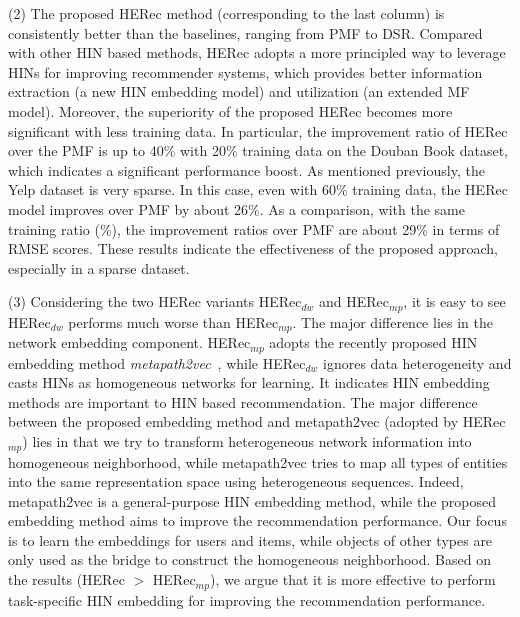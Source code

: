 (2) The proposed HERec method (corresponding to the last column) is consistently better than the baselines, ranging from PMF to DSR.
Compared with other HIN based methods,  HERec adopts a more principled way to leverage HINs for improving recommender systems, which provides better information extraction (a new HIN embedding model) and utilization (an extended MF model).
Moreover, the superiority of the proposed HERec becomes more significant with less training data. In particular, the improvement ratio of HERec over the PMF is up to 40\% with 20\% training data on the Douban Book dataset, which indicates a significant performance boost.
As mentioned previously, the Yelp dataset is very sparse. In this case, even with 60\% training data, the HERec model improves over PMF by about 26\%. As a comparison, with the same training ratio (\%), the improvement ratios over PMF are about 29\% in terms of RMSE scores. These results indicate the effectiveness of the proposed approach, especially in a sparse dataset.

(3) Considering the two HERec variants HERec$_{dw}$ and HERec$_{mp}$, it is easy to see HERec$_{dw}$ performs much worse than HERec$_{mp}$.
The major difference lies in the network embedding component. HERec$_{mp}$ adopts the recently proposed HIN embedding method \emph{metapath2vec}~\cite{dong2017metapath2vec}, while HERec$_{dw}$ ignores data heterogeneity
and casts HINs as homogeneous networks for learning. It indicates HIN embedding methods are important to HIN based recommendation.
The major difference between the proposed embedding method and metapath2vec (adopted by HERec$_{mp}$) lies in that we try to transform heterogeneous network information into homogeneous neighborhood, while metapath2vec tries to map all types of entities into the same representation space using heterogeneous sequences.
Indeed, metapath2vec is a general-purpose HIN embedding method, while the proposed embedding method aims to improve the recommendation performance.
Our focus is to learn the embeddings for users and items, while objects of other types are only used as the bridge to construct the homogeneous neighborhood. Based on the results (HERec $>$ HERec$_{mp}$), we argue that it is more effective to perform task-specific HIN embedding for improving the recommendation performance.


